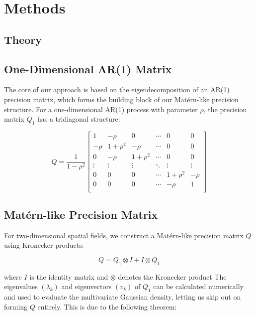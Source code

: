 \documentclass[journal=,manuscript=]{achemso}
\begin{document}
\section{Methods}\label{methods}

\subsection{Theory}\label{theory}

\subsection{One-Dimensional AR(1)
Matrix}\label{one-dimensional-ar1-matrix}

The core of our approach is based on the eigendecomposition of an AR(1)
precision matrix, which forms the building block of our Matérn-like
precision structure. For a one-dimensional AR(1) process with parameter
\(\rho\), the precision matrix \(Q_1\) has a tridiagonal structure:

\[
Q = \frac{1}{1 - \rho^2} \begin{bmatrix}
1 & -\rho & 0 & \cdots & 0 & 0 \\
-\rho & 1+\rho^2 & -\rho & \cdots & 0 & 0 \\
0 & -\rho & 1+\rho^2 & \cdots & 0 & 0 \\
\vdots & \vdots & \vdots & \ddots & \vdots & \vdots \\
0 & 0 & 0 & \cdots & 1+\rho^2 & -\rho \\
0 & 0 & 0 & \cdots & -\rho & 1 \\
\end{bmatrix}
\]

\subsection{Matérn-like Precision
Matrix}\label{matuxe9rn-like-precision-matrix}

For two-dimensional spatial fields, we construct a Matérn-like precision
matrix \(Q\) using Kronecker products:

\[
Q = Q_1 \otimes I + I \otimes Q_1
\]

where \(I\) is the identity matrix and \(\otimes\) denotes the Kronecker
product The eigenvalues \((\lambda_k)\) and eigenvectors \((v_k)\) of
\(Q_1\) can be calculated numerically and used to evaluate the
multivariate Gaussian density, letting us skip out on forming \(Q\)
entirely. This is due to the following theorem:
\end{document}
